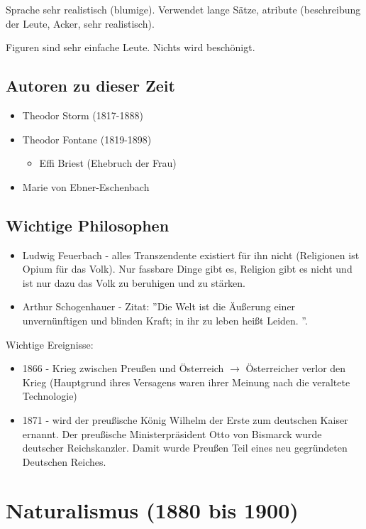 \documentclass[12pt,a4paper]{article}
\begin{document}
Sprache sehr realistisch (blumige). Verwendet lange Sätze, atribute (beschreibung der Leute, Acker, sehr realistisch).

Figuren sind sehr einfache Leute. Nichts wird beschönigt.

\subsection{Autoren zu dieser Zeit}
\begin{itemize}
\item Theodor Storm (1817-1888)
\item Theodor Fontane (1819-1898)
	\begin{itemize}
	\item Effi Briest (Ehebruch der Frau)
	\end{itemize}
\item Marie von Ebner-Eschenbach
\end{itemize}

\subsection{Wichtige Philosophen}
\begin{itemize}
\item Ludwig Feuerbach - alles Transzendente existiert für ihn nicht (Religionen ist Opium für das Volk). Nur fassbare Dinge gibt es, Religion gibt es nicht und ist nur dazu das Volk zu beruhigen und zu stärken.
\item Arthur Schogenhauer - Zitat: ''Die Welt ist die Äußerung einer unvernünftigen und blinden Kraft; in ihr zu leben heißt Leiden. ''. 
\end{itemize}	

Wichtige Ereignisse:

\begin{itemize}
\item 1866 - Krieg zwischen Preußen und Österreich $\rightarrow$ Österreicher verlor den Krieg (Hauptgrund ihres Versagens waren ihrer Meinung nach die veraltete Technologie)
\item 1871 - wird der preußische König Wilhelm der Erste zum deutschen Kaiser ernannt. Der preußische Ministerpräsident Otto von Bismarck wurde deutscher Reichskanzler. Damit wurde Preußen Teil eines neu gegründeten Deutschen Reiches.
\end{itemize}

\newpage

\section{Naturalismus (1880 bis 1900)}
\end{document}
